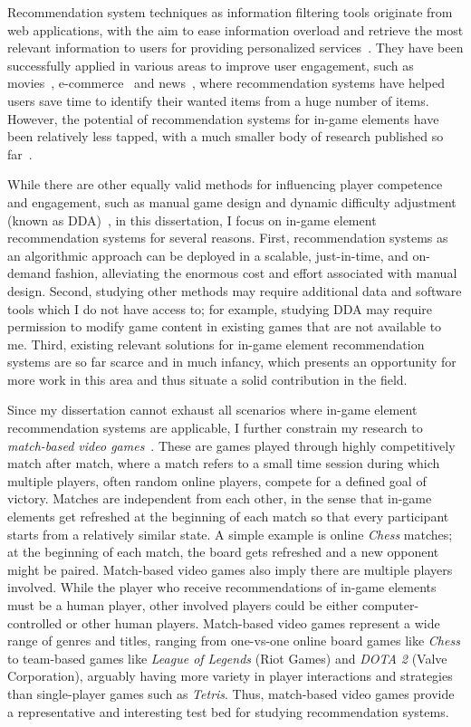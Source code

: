 Recommendation system techniques as information filtering tools originate from web applications, with the aim to ease information overload and retrieve the most relevant information to users for providing personalized services~\cite{isinkaye2015recommendation,bobadilla2013recommender,resnick1997recommender,adomavicius2005toward}. They have been successfully applied in various areas to improve user engagement, such as movies~\cite{amatriain2012netflix}, e-commerce~\cite{linden2003amazon} and news~\cite{das2007google}, where recommendation systems have helped users save time to identify their wanted items from a huge number of items. However, the potential of recommendation systems for in-game elements have been relatively less tapped, with a much smaller body of research published so far~\cite{kolen2018horizontal,wu2017recommendation}.

While there are other equally valid methods for influencing player competence and engagement, such as manual game design and dynamic difficulty adjustment (known as DDA)~\cite{hunicke2005case}, in this dissertation, I focus on in-game element recommendation systems for several reasons. First, recommendation systems as an algorithmic approach can be deployed in a scalable, just-in-time, and on-demand fashion, alleviating the enormous cost and effort associated with manual design.
Second, studying other methods may require additional data and software tools which I do not have access to; for example, studying DDA may require permission to modify game content in existing games that are not available to me. Third, existing relevant solutions for in-game element recommendation systems are so far scarce and in much infancy, which presents an opportunity for more work in this area and thus situate a solid contribution in the field.  


Since my dissertation cannot exhaust all scenarios where in-game element recommendation systems are applicable, I further constrain my research to \textit{match-based video games}~\cite{guo2012analysis}. These are games played through highly competitively match after match, where a match refers to a small time session during which multiple players, often random online players, compete for a defined goal of victory. Matches are independent from each other, in the sense that in-game elements get refreshed at the beginning of each match so that every participant starts from a relatively similar state. A simple example is online \textit{Chess} matches; at the beginning of each match, the board gets refreshed and a new opponent might be paired. Match-based video games also imply there are multiple players involved. While the player who receive recommendations of in-game elements must be a human player, other involved players could be either computer-controlled or other human players. Match-based video games represent a wide range of genres and titles, ranging from one-vs-one online board games like \textit{Chess} to team-based games like \textit{League of Legends} (Riot Games) and \textit{DOTA 2} (Valve Corporation), arguably having more variety in player interactions and strategies than single-player games such as \textit{Tetris}. Thus, match-based video games provide a representative and interesting test bed for studying recommendation systems.

